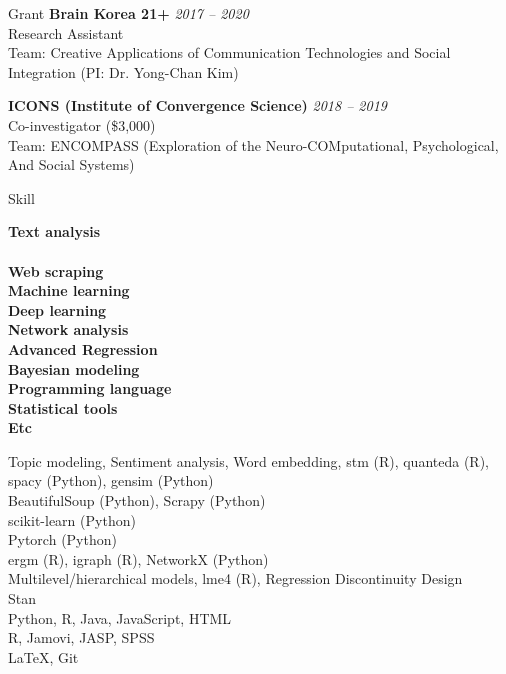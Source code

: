 \documentclass{resume} %
\begin{document}
\begin{rSection}{Grant}
{\bf Brain Korea 21+} \hfill {\em 2017 -- 2020}\\
Research Assistant\\
Team: Creative Applications of Communication Technologies and Social Integration (PI: Dr. Yong-Chan Kim)

{\bf ICONS (Institute of Convergence Science)} \hfill {\em 2018 -- 2019}\\
Co-investigator (\$3,000)\\
Team: ENCOMPASS (Exploration of the Neuro-COMputational, Psychological, And Social Systems)
\end{rSection}


\begin{rSection}{Skill}
\begin{minipage}[t]{.25\textwidth}
{\bf Text analysis\\ \\Web scraping \\Machine learning \\ Deep learning \\ Network analysis\\Advanced Regression\\ Bayesian modeling\\Programming language\\Statistical tools\\Etc}
\end{minipage}
\begin{minipage}[t]{.70\textwidth}
Topic modeling, Sentiment analysis, Word embedding, stm (R), quanteda (R), spacy (Python), gensim (Python)\\ BeautifulSoup (Python), Scrapy (Python)\\ scikit-learn (Python) \\ Pytorch (Python) \\ ergm (R), igraph (R), NetworkX (Python)\\Multilevel/hierarchical models, lme4 (R), Regression Discontinuity Design\\ Stan \\Python, R, Java, JavaScript, HTML\\R, Jamovi, JASP, SPSS\\\LaTeX, Git
\end{minipage}

\end{rSection}
\end{document}
